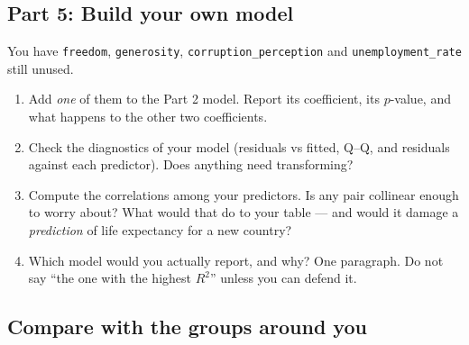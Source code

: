 \documentclass{article}
\begin{document}
\newpage

\subsection*{Part 5: Build your own model}

You have \texttt{freedom}, \texttt{generosity}, \texttt{corruption\_perception} and \texttt{unemployment\_rate} still unused.

\begin{enumerate}[label={\bfseries (\Alph*)},itemsep=.8em]
\item Add \emph{one} of them to the Part 2 model. Report its coefficient, its $p$-value, and what happens to the other two coefficients. \\[4em]
\item Check the diagnostics of your model (residuals vs fitted, Q--Q, and residuals against each predictor). Does anything need transforming? \\[4em]
\item Compute the correlations among your predictors. Is any pair collinear enough to worry about? What would that do to your table --- and would it damage a \emph{prediction} of life expectancy for a new country? \\[4.5em]
\item Which model would you actually report, and why? One paragraph. Do not say ``the one with the highest $R^2$'' unless you can defend it. \\[5em]
\end{enumerate}

\subsection*{Compare with the groups around you}

\noindent{}
\end{document}
